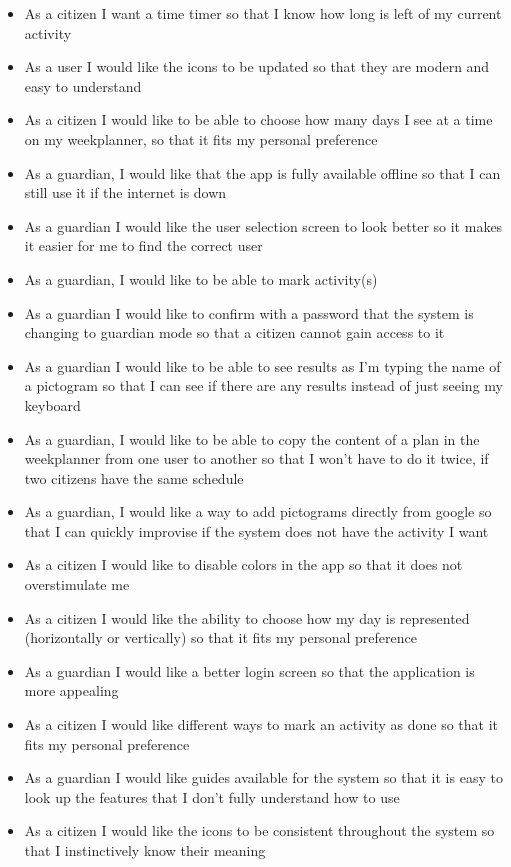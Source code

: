 \begin{itemize}
    \item As a citizen I want a time timer so that I know how long is left of my current activity
    \item As a user I would like the icons to be updated so that they are modern and easy to understand
    \item As a citizen I would like to be able to choose how many days I see at a time on my weekplanner, so that it fits my personal preference
    \item As a guardian, I would like that the app is fully available offline so that I can still use it if the internet is down 
    \item As a guardian I would like the user selection screen to look better so it makes it easier for me to find the correct user 
    \item As a guardian, I would like to be able to mark activity(s)
    \item As a guardian I would like to confirm with a password that the system is changing to guardian mode so that a citizen cannot gain access to it 
    \item As a guardian I would like to be able to see results as I'm typing the name of a pictogram so that I can see if there are any results instead of just seeing my keyboard
    \item As a guardian, I would like to be able to copy the content of a plan in the weekplanner from one user to another so that I won't have to do it twice, if two citizens have the same schedule
    \item As a guardian, I would like a way to add pictograms directly from google so that I can quickly improvise if the system does not have the activity I want 
    \item As a citizen I would like to disable colors in the app so that it does not overstimulate me
    \item As a citizen I would like the ability to choose how my day is represented (horizontally or vertically) so that it fits my personal preference 
    \item As a guardian I would like a better login screen so that the application is more appealing
    \item As a citizen I would like different ways to mark an activity as done so that it fits my personal preference
    \item As a guardian I would like guides available for the system so that it is easy to look up the features that I don't fully understand how to use 
    \item As a citizen I would like the icons to be consistent throughout the system so that I instinctively know their meaning 
\end{itemize}

